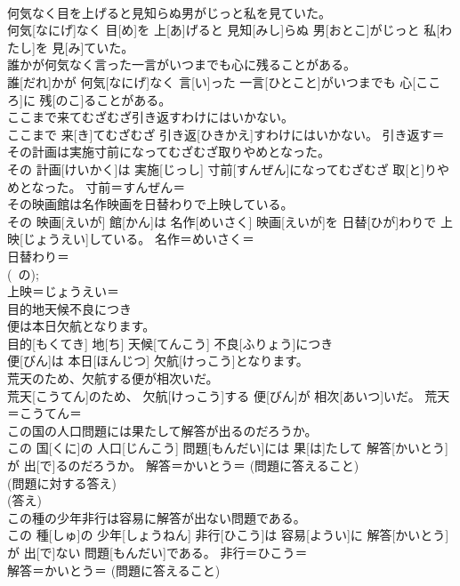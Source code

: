 \documentclass[8pt]{extreport}
\begin{document}
\begin{CJK}{UTF8}{min}
\\	何気なく目を上げると見知らぬ男がじっと私を見ていた。	
\\	何気[なにげ]なく 目[め]を 上[あ]げると 見知[みし]らぬ 男[おとこ]がじっと 私[わたし]を 見[み]ていた。	
\\	誰かが何気なく言った一言がいつまでも心に残ることがある。	
\\	誰[だれ]かが 何気[なにげ]なく 言[い]った 一言[ひとこと]がいつまでも 心[こころ]に 残[のこ]ることがある。	
\\	ここまで来てむざむざ引き返すわけにはいかない。	
\\	ここまで 来[き]てむざむざ 引き返[ひきかえ]すわけにはいかない。	引き返す＝ 
\\	その計画は実施寸前になってむざむざ取りやめとなった。	
\\	その 計画[けいかく]は 実施[じっし] 寸前[すんぜん]になってむざむざ 取[と]りやめとなった。	寸前＝すんぜん＝ 
\\	その映画館は名作映画を日替わりで上映している。	
\\	その 映画[えいが] 館[かん]は 名作[めいさく] 映画[えいが]を 日替[ひが]わりで 上映[じょうえい]している。	名作＝めいさく＝ 
\\	日替わり＝ 
\\	(~の); 
\\	上映＝じょうえい＝ 
\\	目的地天候不良につき 
\\	便は本日欠航となります。	
\\	目的[もくてき] 地[ち] 天候[てんこう] 不良[ふりょう]につき 
\\	便[びん]は 本日[ほんじつ] 欠航[けっこう]となります。	
\\	荒天のため、欠航する便が相次いだ。	
\\	荒天[こうてん]のため、 欠航[けっこう]する 便[びん]が 相次[あいつ]いだ。	荒天＝こうてん＝ 
\\	この国の人口問題には果たして解答が出るのだろうか。	
\\	この 国[くに]の 人口[じんこう] 問題[もんだい]には 果[は]たして 解答[かいとう]が 出[で]るのだろうか。	解答＝かいとう＝ (問題に答えること) 
\\	(問題に対する答え) 
\\	(答え)
\\	この種の少年非行は容易に解答が出ない問題である。	
\\	この 種[しゅ]の 少年[しょうねん] 非行[ひこう]は 容易[ようい]に 解答[かいとう]が 出[で]ない 問題[もんだい]である。	非行＝ひこう＝ 
\\	解答＝かいとう＝ (問題に答えること) 

\end{CJK}
\end{document}
